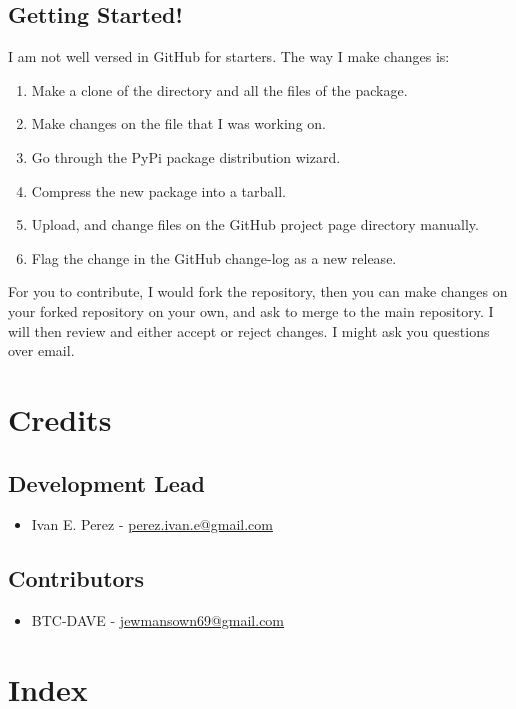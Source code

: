 \documentclass[refman]{article}
\begin{document}
 \subsection{Getting Started!}
 I am not well versed in GitHub for starters. The way I make changes is:
 \begin{enumerate}
 	\item Make a clone of the directory and all the files of the package. 
 	\item Make changes on the file that I was working on.
 	\item Go through the PyPi package distribution wizard.
 	\item Compress the new package into a tarball.
 	\item Upload, and change files on the GitHub project page directory manually.
 	\item Flag the change in the GitHub change-log as a new release.
 \end{enumerate}

\noindent For you to contribute, I would fork the repository, then you can make changes on your forked repository on your own, and ask to merge to the main repository. I will then review and either accept or reject changes. I might ask you questions over email. 
 \newpage
 \section{Credits}
 \subsection{Development Lead}
 \begin{itemize}
 	\item Ivan E. Perez -  \href{mailto:perez.ivan.e@gmail.com}{perez.ivan.e@gmail.com}
 \end{itemize}
 \subsection{Contributors}
 \begin{itemize}
 	\item BTC-DAVE - \href{mailto:jewmansown69@gmail.com}{jewmansown69@gmail.com}
 \end{itemize}
 \newpage
 
 



 \section{Index}
\end{document}
